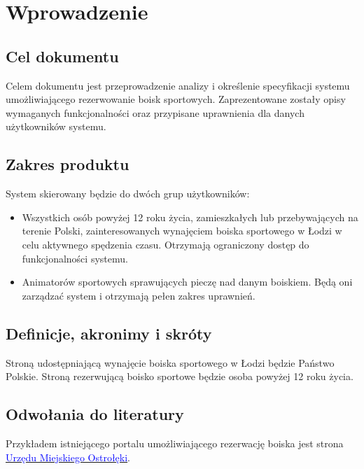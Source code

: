 \documentclass[a4paper,11pt]{article}
\begin{document}
\section {Wprowadzenie}

\subsection {Cel dokumentu}
Celem dokumentu jest przeprowadzenie analizy i określenie specyfikacji systemu umożliwiającego rezerwowanie boisk sportowych. Zaprezentowane zostały opisy wymaganych funkcjonalności oraz przypisane uprawnienia dla danych użytkowników systemu.

\subsection {Zakres produktu}
System skierowany będzie do dwóch grup użytkowników:
\begin{itemize}
	\item Wszystkich osób powyżej 12 roku życia, zamieszkałych lub przebywających na terenie Polski, zainteresowanych wynajęciem boiska sportowego w Łodzi w celu aktywnego spędzenia czasu. Otrzymają ograniczony dostęp do funkcjonalności systemu.
	\item Animatorów sportowych sprawujących pieczę nad danym boiskiem. Będą oni zarządzać system i otrzymają pełen zakres uprawnień.
\end{itemize}

\subsection {Definicje, akronimy i skróty}
Stroną udostępniającą wynajęcie boiska sportowego w Łodzi będzie Państwo Polskie.
Stroną rezerwującą boisko sportowe będzie osoba powyżej 12 roku życia. 

\subsection {Odwołania do literatury}
Przykładem istniejącego portalu umożliwiającego rezerwację boiska jest strona  \href{https://www.ostroleka.pl/boiska/}{\textcolor{blue}{Urzędu Miejskiego Ostrołęki}}.
\end{document}
